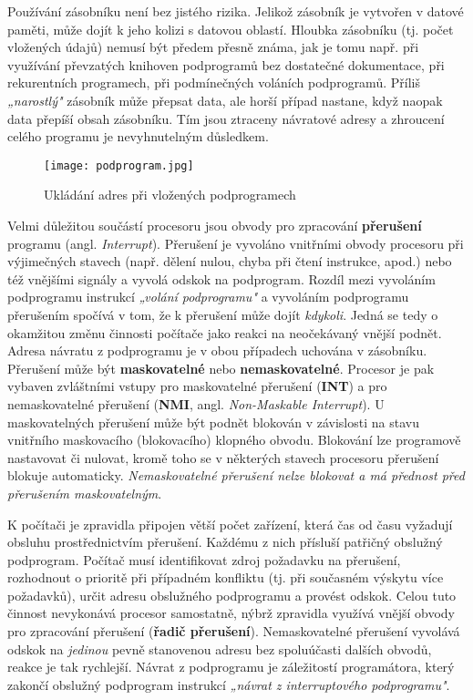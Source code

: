     Používání zásobníku není bez jistého rizika. Jelikož zásobník je vytvořen v datové paměti, může 
    dojít k jeho kolizi s datovou oblastí. Hloubka zásobníku (tj. počet vložených údajů) nemusí být 
    předem přesně známa, jak je tomu např. při využívání převzatých knihoven podprogramů bez 
    dostatečné dokumentace, při rekurentních programech, při podmínečných voláních podprogramů. 
    Příliš \emph{„narostlý"} zásobník může přepsat data, ale horší případ nastane, když naopak data 
    přepíší obsah zásobníku. Tím jsou ztraceny návratové adresy a zhroucení celého programu je 
    nevyhnutelným důsledkem.    
    
    \begin{figure}[ht!] %
      \centering
      \texttt{[image: podprogram.jpg]}
      \caption{Ukládání adres při vložených podprogramech}
      \label{MIT:fig_podprogram}
    \end{figure}
    
    Velmi důležitou součástí procesoru jsou obvody pro zpracování \textbf{přerušení} programu 
    (angl. \emph{Interrupt}). Přerušení je vyvoláno vnitřními obvody procesoru při výjimečných 
    stavech (např. dělení nulou, chyba při čtení instrukce, apod.) nebo též vnějšími signály a 
    vyvolá odskok na podprogram. Rozdíl mezi vyvoláním podprogramu instrukcí \emph{„volání 
    podprogramu"} a vyvoláním podprogramu přerušením spočívá v tom, že k přerušení může dojít 
    \emph{kdykoli}. Jedná se tedy o okamžitou změnu činnosti počítače jako reakci na neočekávaný 
    vnější podnět. Adresa návratu z podprogramu je v obou případech uchována v zásobníku. Přerušení 
    může být \textbf{maskovatelné} nebo \textbf{nemaskovatelné}. Procesor je pak vybaven zvláštními 
    vstupy pro maskovatelné přerušení (\textbf{INT}) a pro nemaskovatelné přerušení   
    (\textbf{NMI}, angl. \emph{Non-Maskable Interrupt}). U maskovatelných přerušení může být podnět 
    blokován v závislosti na stavu vnitřního maskovacího (blokovacího) klopného obvodu. Blokování 
    lze programově nastavovat či nulovat, kromě toho se v některých stavech procesoru přerušení 
    blokuje automaticky. \emph{Nemaskovatelné přerušení nelze blokovat a má přednost před 
    přerušením maskovatelným}.
    
    K počítači je zpravidla připojen větší počet zařízení, která čas od času vyžadují obsluhu 
    prostřednictvím přerušení. Každému z nich přísluší patřičný obslužný podprogram. Počítač musí 
    identifikovat zdroj požadavku na přerušení, rozhodnout o prioritě při případném konfliktu (tj. 
    při současném výskytu více požadavků), určit adresu obslužného podprogramu a provést odskok. 
    Celou tuto činnost nevykonává procesor samostatně, nýbrž zpravidla využívá vnější obvody pro 
    zpracování přerušení (\textbf{řadič přerušení}). Nemaskovatelné přerušení vyvolává odskok na 
    \emph{jedinou} pevně stanovenou adresu bez spoluúčasti dalších obvodů, reakce je tak rychlejší. 
    Návrat z podprogramu je záležitostí programátora, který zakončí obslužný podprogram instrukcí 
    \emph{„návrat z interruptového podprogramu"}.
    
